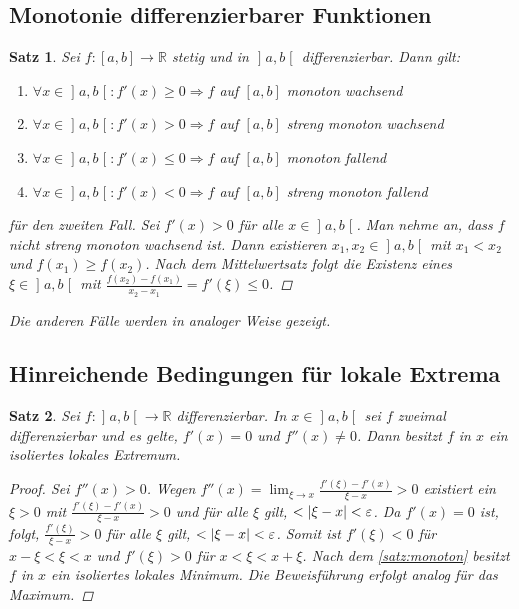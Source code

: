 \documentclass[ngerman,titlepage,twoside, parskip=half*]{scrreprt}
\newcommand*{\R}{\mathbb{R}}
\theoremstyle{break}
\newtheorem{theorem}{Satz}[section]
\theoremstyle{nonumberbreak}
\newtheorem{proof}{Beweis:}
\DeclarePairedDelimiter{\abs}{\lvert}{\rvert}
\newcommand*{\bsofint}[1]{\mathopen{]}#1\mathclose{[}} %
\begin{document}
\subsection{Monotonie differenzierbarer Funktionen}
\begin{theorem}
  \label{satz:monoton}
  Sei $f\colon[a,b]\rightarrow\R$ stetig und in $\bsofint{a,b}$ differenzierbar. Dann
  gilt:
  \begin{enumerate}
    \item $\forall x \in \bsofint{a,b}\colon f'(x)\geq0 \Rightarrow f$ auf $[a,b]$
      monoton wachsend
    \item $\forall x \in \bsofint{a,b}\colon f'(x)> 0\Rightarrow f$ auf $[a,b]$ 
      streng monoton wachsend
    \item $\forall x \in \bsofint{a,b}\colon f'(x)\leq0 \Rightarrow f$ auf $[a,b]$
      monoton fallend
    \item $\forall x \in \bsofint{a,b}\colon f'(x)< 0\Rightarrow f$ auf $[a,b]$
      streng monoton fallend
  \end{enumerate}
  \begin{proof}[für den zweiten Fall]
    Sei $f'(x)>0$ für alle $x\in \bsofint{a,b}$. Man nehme an, dass
    $f$ nicht streng monoton wachsend ist. Dann existieren
    $x_1,x_2\in\bsofint{a,b}$ mit $x_1<x_2$ und $f(x_1)\geq
    f(x_2)$. Nach dem Mittelwertsatz folgt die Existenz eines
    $\xi\in\bsofint{a,b}$ mit $\frac{f(x_2)-f(x_1)}{x_2-x_1}
    =f'(\xi)\leq 0$\lightning.
  \end{proof}
  Die anderen Fälle werden in analoger Weise gezeigt.
\end{theorem}

\subsection{Hinreichende Bedingungen für lokale Extrema}
\begin{theorem}\label{satz:lokExtrema}
  Sei $f\colon\bsofint{a,b}\rightarrow\R$ differenzierbar. In $x \in
  \bsofint{a,b}$ sei $f$ zweimal differenzierbar und es gelte,
  $f'(x)=0$ und $f''(x)\neq 0$.  Dann besitzt $f$ in $x$ ein
  isoliertes lokales Extremum.
  \begin{proof}
    Sei $f''(x)>0$. Wegen $f''(x)=\lim_{\xi\rightarrow x}
    \frac{f'(\xi)-f'(x)}{\xi-x}>0$ existiert ein $\xi>0$ mit
    $\frac{f'(\xi)-f'(x)}{\xi-x}>0$ und für alle $\xi$ gilt,
    $<\abs{\xi-x}<\varepsilon$.  Da $f'(x)=0$ ist, folgt,
    $\frac{f'(\xi)}{\xi-x}>0$ für alle $\xi$ gilt,
    $<\abs{\xi-x}<\varepsilon$. Somit ist $f'(\xi)<0$ für
    $x-\xi<\xi<x$ und $f'(\xi)>0$ für $x<\xi<x+\xi$. Nach dem
    \autoref{satz:monoton} besitzt $f$ in $x$ ein isoliertes lokales
    Minimum. Die Beweisführung erfolgt analog für das Maximum.
  \end{proof}
\end{theorem}
\end{document}
